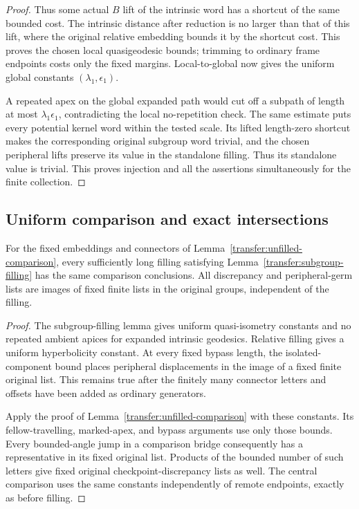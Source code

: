 \begin{proof}
Thus some actual \(B\) lift of the intrinsic word has a shortcut of the same bounded cost. The intrinsic distance after reduction is no larger than that of this lift, where the original relative embedding bounds it by the shortcut cost. This proves the chosen local quasigeodesic bounds; trimming to ordinary frame endpoints costs only the fixed margins. Local-to-global now gives the uniform global constants \((\lambda_1,\epsilon_1)\).

A repeated apex on the global expanded path would cut off a subpath of length at most \(\lambda_1\epsilon_1\), contradicting the local no-repetition check. The same estimate puts every potential kernel word within the tested scale. Its lifted length-zero shortcut makes the corresponding original subgroup word trivial, and the chosen peripheral lifts preserve its value in the standalone filling. Thus its standalone value is trivial. This proves injection and all the assertions simultaneously for the finite collection.
\end{proof}

\subsection{Uniform comparison and exact intersections}

\begin{lemma}\label{transfer:path-comparison}
For the fixed embeddings and connectors of
Lemma~\ref{transfer:unfilled-comparison}, every sufficiently long
filling satisfying Lemma~\ref{transfer:subgroup-filling} has the same
comparison conclusions. All discrepancy and peripheral-germ lists
are images of fixed finite lists in the original groups, independent
of the filling.
\end{lemma}
\begin{proof}
The subgroup-filling lemma gives uniform quasi-isometry constants
and no repeated ambient apices for expanded intrinsic geodesics.
Relative filling gives a uniform hyperbolicity constant. At every
fixed bypass length, the isolated-component bound places peripheral
displacements in the image of a fixed finite original list. This
remains true after the finitely many connector letters and offsets
have been added as ordinary generators.

Apply the proof of Lemma~\ref{transfer:unfilled-comparison} with these
constants. Its fellow-travelling, marked-apex, and bypass arguments
use only those bounds. Every bounded-angle jump in a comparison
bridge consequently has a representative in its fixed original
list. Products of the bounded number of such letters give fixed
original checkpoint-discrepancy lists as well. The central comparison
uses the same constants independently of remote endpoints, exactly
as before filling.
\end{proof}

